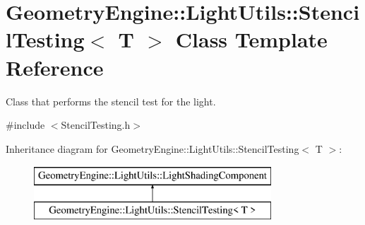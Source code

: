 \hypertarget{class_geometry_engine_1_1_light_utils_1_1_stencil_testing}{}\section{Geometry\+Engine\+::Light\+Utils\+::Stencil\+Testing$<$ T $>$ Class Template Reference}
\label{class_geometry_engine_1_1_light_utils_1_1_stencil_testing}


Class that performs the stencil test for the light.  




{\ttfamily \#include $<$Stencil\+Testing.\+h$>$}

Inheritance diagram for Geometry\+Engine\+::Light\+Utils\+::Stencil\+Testing$<$ T $>$\+:\begin{figure}[H]
\begin{center}
\leavevmode
\includegraphics[height=2.000000cm]{class_geometry_engine_1_1_light_utils_1_1_stencil_testing}
\end{center}
\end{figure}
